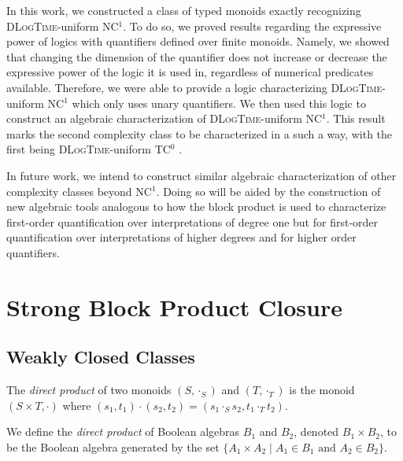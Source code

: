 \documentclass[a4paper,UKenglish,cleveref, autoref, thm-restate, anonymous]{lipics-v2021}
\begin{document}
In this work, we constructed a class of typed monoids exactly recognizing \textsc{DLogTime}-uniform NC${}^1$. To do so, we proved results regarding the expressive power of logics with quantifiers defined over finite monoids. Namely, we showed that changing the dimension of the quantifier does not increase or decrease the expressive power of the logic it is used in, regardless of numerical predicates available. Therefore, we were able to provide a logic characterizing \textsc{DLogTime}-uniform NC${}^1$ which only uses unary quantifiers. We then used this logic to construct an algebraic characterization of \textsc{DLogTime}-uniform NC${}^1$. This result marks the second complexity class to be characterized in a such a way, with the first being \textsc{DLogTime}-uniform TC${}^0$ \cite{krebs2007characterizing}.

In future work, we intend to construct similar algebraic characterization of other complexity classes beyond NC${}^1$. Doing so will be aided by the construction of new algebraic tools analogous to how the block product is used to characterize first-order quantification over interpretations of degree one but for first-order quantification over interpretations of higher degrees and for higher order quantifiers.






\appendix

\section{Strong Block Product Closure}\label{app:bp}

\subsection{Weakly Closed Classes}

\begin{definition}
    The \emph{direct product} of two monoids $(S, \cdot_S)$ and $(T, \cdot_T)$ is the monoid $(S \times T, \cdot)$ where $(s_1, t_1) \cdot (s_2, t_2) = (s_1 \cdot_S s_2, t_1 \cdot_T t_2)$.
\end{definition}
\begin{definition}
    We define the \emph{direct product} of Boolean algebras $B_1$ and $B_2$, denoted $B_1 \times B_2$, to be the Boolean algebra generated by the set $\{A_1 \times A_2 \mid A_1 \in B_1 \text{ and } A_2 \in B_2\}$.
\end{definition}
\end{document}
